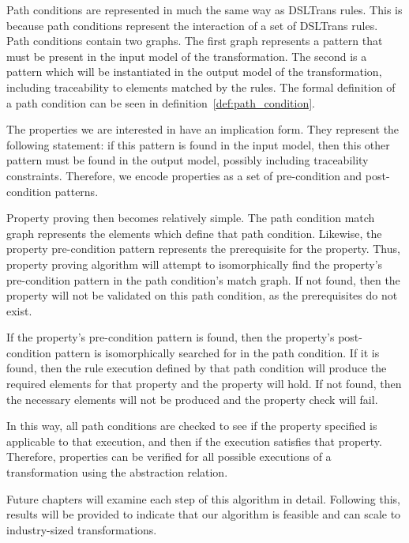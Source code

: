 Path conditions are represented in much the same way as DSLTrans rules. This is because path conditions represent the interaction of a set of DSLTrans rules. Path conditions contain two graphs. The first graph represents a pattern that must be present in the input model of the transformation. The second is a pattern which will be instantiated in the output model of the transformation, including traceability to elements matched by the rules. The formal definition of a path condition can be seen in definition~\ref{def:path_condition}.

The properties we are interested in have an implication form. They represent the
following statement: if this pattern is found in the input model, then
this other pattern must be found in the output model, possibly including traceability constraints. Therefore,
we encode properties as a set of pre-condition and post-condition patterns.

Property proving then becomes relatively simple. The path condition match graph
represents the elements which define that path condition. Likewise, the property
pre-condition pattern represents the prerequisite for the property. Thus,
property proving algorithm will attempt to isomorphically find the property's
pre-condition pattern in the path condition's match graph. If not found, then the
property will not be validated on this path condition, as the prerequisites do
not exist.

If the property's pre-condition pattern is found, then the property's
post-condition pattern is isomorphically searched for in the path condition. If
it is found, then the rule execution defined by that path condition will produce
the required elements for that property and the property will hold. If not
found, then the necessary elements will not be produced and the property check
will fail.

In this way, all path conditions are checked to see if the property specified is
applicable to that execution, and then if the execution satisfies that property.
Therefore, properties can be verified for all possible executions of a
transformation using the abstraction relation.

Future chapters will examine each step of this algorithm in detail. Following this, results will be provided to indicate that our algorithm is feasible and can scale to industry-sized transformations.